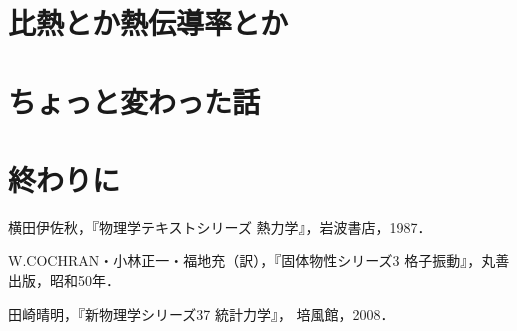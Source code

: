 \documentclass[10pt,b5paper,papersize,dvipdfmx]{jsbook}
\begin{document}
\section{比熱とか熱伝導率とか}

\section{ちょっと変わった話}

\section{終わりに}

\begin{thebibliography}{99}
  \item 横田伊佐秋，『物理学テキストシリーズ 熱力学』，岩波書店，1987．
  \item W.COCHRAN・小林正一・福地充（訳），『固体物性シリーズ3 格子振動』，丸善出版，昭和50年．
  \item 田崎晴明，『新物理学シリーズ37 統計力学』， 培風館，2008．
\end{thebibliography}
\end{document}
